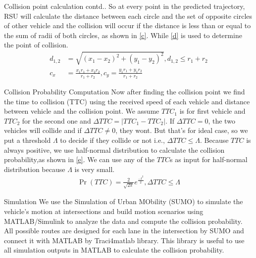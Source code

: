 \documentclass{beamer}
\providecommand{\pr}[1]{\ensuremath{\Pr\left(#1\right)}}
\begin{document}
\begin{frame}{Collision point calculation contd..}
    So at every point in the predicted trajectory, RSU will calculate the distance between each circle and the set of opposite circles of other vehicle and the  collision will occur if the distance is less than or equal to the sum of radii of both circles,  as shown in \eqref{c}. While \eqref{d} is used to determine the point of collision.
    \begin{align}
        d_{1,2}&=\sqrt{(x_1-x_2)^2+(y_1-y_2)^2}, d_{1,2}\leq r_1+r_2
        \label{c}\\
        c_x&=\frac{x_1r_1+x_2r_2}{r_1+r_2},c_y=\frac{y_1r_1+y_1r_2}{r_1+r_2}
        \label{d}
    \end{align}
\end{frame}
\begin{frame}{Collision Probability Computation}
    Now after finding the collision point we find the time to collision (TTC) using the received speed of each vehicle and distance between vehicle and the collision point. We assume $TTC_1$ is for first vehicle and $TTC_2$ for the second one and $\Delta TTC=\lvert TTC_1-TTC_2\rvert$. If $\Delta TTC=0$, the two vehicles will collide and if $\Delta TTC\neq0$, they wont. But that's for ideal case, so we put a threshold $\Lambda$ to decide if they collide or not i.e., $\Delta TTC\leq\Lambda$. Because $TTC$ is always positive, we use half-normal distribution to calculate the collision probability,as shown in \eqref{e}. We can use any of the $TTC$s as input for half-normal distribution because $\Lambda$ is very small. 
    \begin{align}
        \pr{TTC}=\frac{2}{\sqrt{2\pi}}e^{\frac{-t^2}{2}},\Delta TTC\leq\Lambda
        \label{e}
    \end{align}
\end{frame}
\begin{frame}{Simulation}
    We  use  the  Simulation of Urban MObility  (SUMO) to simulate the vehicle’s motion at intersections and build motion scenarios using MATLAB/Simulink to analyze the data and compute the collision probability. All possible routes are designed for each lane in the intersection by SUMO and connect it with MATLAB by Traci4matlab library. This library is useful to use all simulation outputs in MATLAB to calculate the collision probability.
\end{frame}
\end{document}
